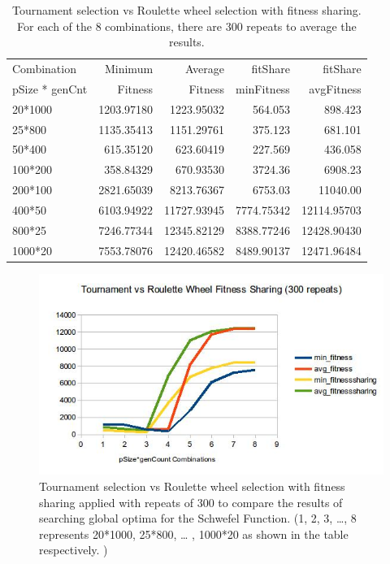\documentclass[10pt,b5paper]{article}
\begin{document}
\begin{table}[htb]
\caption{Tournament selection vs Roulette wheel selection with fitness sharing. For each of the 8 combinations, there are 300 repeats to average the results.}
\centering
\begin{tabular}{lrrrr}
\hline
Combination & Minimum & Average & fitShare & fitShare\\
pSize * genCnt & Fitness & Fitness & minFitness & avgFitness\\
\hline
20*1000 & 1203.97180 & 1223.95032 & 564.053 & 898.423\\
25*800 & 1135.35413 & 1151.29761 & 375.123 & 681.101\\
50*400 & 615.35120 & 623.60419 & 227.569 & 436.058\\
100*200 & 358.84329 & 670.93530 & 3724.36 & 6908.23\\
200*100 & 2821.65039 & 8213.76367 & 6753.03 & 11040.00\\
400*50 & 6103.94922 & 11727.93945 & 7774.75342 & 12114.95703\\
800*25 & 7246.77344 & 12345.82129 & 8388.77246 & 12428.90430\\
1000*20 & 7553.78076 & 12420.46582 & 8489.90137 & 12471.96484\\
\hline
\end{tabular}
\end{table}

\begin{figure}[htb]
\centering
\includegraphics[width=.9\linewidth]{./c300.jpg}
\caption{Tournament selection vs Roulette wheel selection with fitness sharing applied with repeats of 300 to compare the results of searching global optima for the Schwefel Function. (1, 2, 3, \ldots{}, 8 represents 20*1000, 25*800, \ldots{} , 1000*20 as shown in the table respectively. )}
\end{figure}
\end{document}
